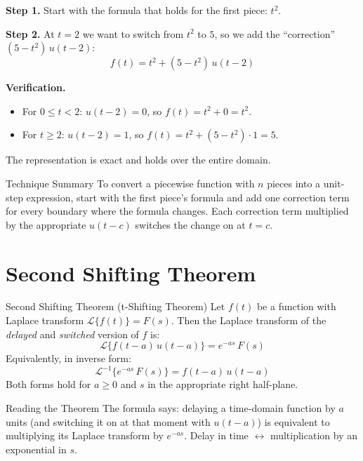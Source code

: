 \documentclass[12pt,a4paper]{article}
\begin{document}
\textbf{Step 1.} Start with the formula that holds for the first piece: $t^2$.

\textbf{Step 2.} At $t = 2$ we want to switch from $t^2$ to $5$, so we add the
``correction'' $(5 - t^2)\,u(t-2)$:
\[
  f(t) = t^2 + (5 - t^2)\,u(t-2)
\]

\textbf{Verification.}
\begin{itemize}
  \item For $0 \leq t < 2$: $u(t-2) = 0$, so $f(t) = t^2 + 0 = t^2$. \checkmark
  \item For $t \geq 2$: $u(t-2) = 1$, so $f(t) = t^2 + (5 - t^2) \cdot 1 = 5$. \checkmark
\end{itemize}

The representation is exact and holds over the entire domain.

\begin{learnbox}{Technique Summary}
To convert a piecewise function with $n$ pieces into a unit-step expression, start with the
first piece's formula and add one correction term for every boundary where the formula
changes. Each correction term multiplied by the appropriate $u(t - c)$ switches the change
on at $t = c$.
\end{learnbox}

\section{Second Shifting Theorem}

\begin{infobox}{Second Shifting Theorem (t-Shifting Theorem)}
Let $f(t)$ be a function with Laplace transform $\mathcal{L}\{f(t)\} = F(s)$.
Then the Laplace transform of the \emph{delayed} and \emph{switched} version of $f$ is:
\[
  \boxed{\mathcal{L}\{f(t-a)\,u(t-a)\} = e^{-as}\,F(s)}
\]
Equivalently, in inverse form:
\[
  \mathcal{L}^{-1}\{e^{-as}\,F(s)\} = f(t-a)\,u(t-a)
\]
Both forms hold for $a \geq 0$ and $s$ in the appropriate right half-plane.
\end{infobox}

\begin{learnbox}{Reading the Theorem}
The formula says: delaying a time-domain function by $a$ units (and switching it on at that
moment with $u(t-a)$) is equivalent to multiplying its Laplace transform by $e^{-as}$.
Delay in time $\leftrightarrow$ multiplication by an exponential in $s$.
\end{learnbox}
\end{document}
